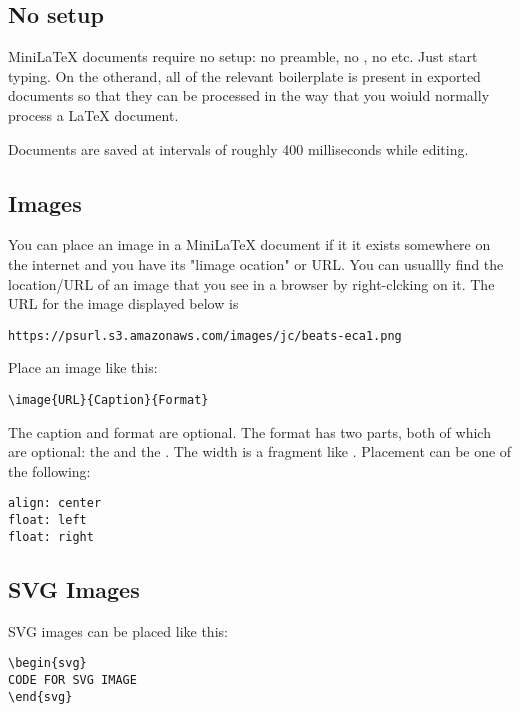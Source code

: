 \subsection{No setup}

MiniLaTeX documents require no setup: no preamble, no , no  etc.  Just start typing. On the otherand, all of the relevant boilerplate is present in exported documents so that they can be processed in the way that you woiuld normally process a LaTeX document.

Documents are saved at intervals of roughly 400 milliseconds while editing.

\subsection{Images}

You can place an image in a MiniLaTeX document if it it exists somewhere on the internet and you have its "limage ocation" or URL.  You can usuallly find the location/URL of an image that you see in a browser  by right-clcking on it. The URL for the image displayed below is

\begin{verbatim}
https://psurl.s3.amazonaws.com/images/jc/beats-eca1.png
\end{verbatim}

Place an image like this:

\begin{verbatim}
\image{URL}{Caption}{Format}
\end{verbatim}

The caption and format are optional.  The format has two parts, both of which are optional: the  and the . The width is a fragment like .  Placement can be one of the following:

\begin{verbatim}
align: center
float: left
float: right
\end{verbatim}


\subsection{SVG Images}

SVG images can be placed like this:

\begin{verbatim}
\begin{svg}
CODE FOR SVG IMAGE
\end{svg}
\end{verbatim}


